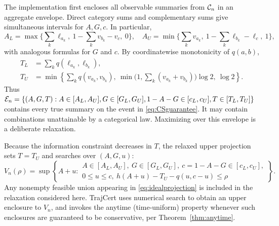 The implementation first encloses all observable summaries from $\mathcal C_n$ in an aggregate envelope. Direct category sums and complementary sums give simultaneous intervals for $A,G,c$. In particular,
\begin{equation}\label{eq:aggregate}
 A_L=\max\Big\{\sum_k\ell_{a_k},\ 1-\sum_kv_{b_k}-v_c,\ 0\Big\},\quad
 A_U=\min\Big\{\sum_kv_{a_k},\ 1-\sum_k\ell_{b_k}-\ell_c,\ 1\Big\},
\end{equation}
with analogous formulas for $G$ and $c$. By coordinatewise monotonicity of $q(a,b)$,
\begin{align}
 T_L&=\sum_k q(\ell_{a_k},\ell_{b_k}),\label{eq:entropyenv}\\
 T_U&=\min\left\{\sum_kq(v_{a_k},v_{b_k}),\
 \min\big(1,\sum_k(v_{a_k}+v_{b_k})\big)\log2,\ \log2\right\}.\nonumber
\end{align}
Thus $\mathcal E_n=\{(A,G,T):A\in[A_L,A_U],G\in[G_L,G_U],1-A-G\in[c_L,c_U],T\in[T_L,T_U]\}$ contains every true summary on the event in \eqref{eq:CSguarantee}. It may contain combinations unattainable by a categorical law. Maximizing over this envelope is a deliberate relaxation.

Because the information constraint decreases in $T$, the relaxed upper projection sets $T=T_U$ and searches over $(A,G,u)$:
\begin{equation}\label{eq:relaxedprojection}
 V_n(\rho)=\sup\left\{A+u:
 \begin{array}{l} A\in[A_L,A_U],\ G\in[G_L,G_U],\ c=1-A-G\in[c_L,c_U],\\
 0\le u\le c,\ h(A+u)-T_U-q(u,c-u)\le\rho
 \end{array}\right\}.
\end{equation}
Any nonempty feasible union appearing in \eqref{eq:idealprojection} is included in the relaxation considered here. TrajCert uses numerical search to obtain an upper enclosure to $V_n$, and invokes the anytime (time-uniform) property whenever such enclosures are guaranteed to be conservative, per Theorem~\ref{thm:anytime}.

